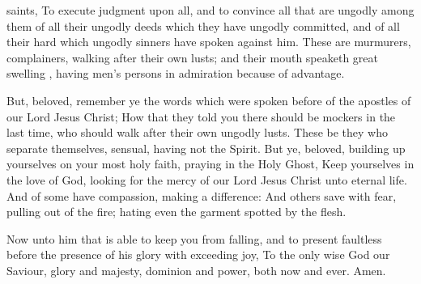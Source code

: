 {saints,
To
execute
judgment
upon
all,
and to
convince
all that are
ungodly among
them
of
all
their
ungodly
deeds
which they have ungodly
committed,
and
of
all their
hard
{}
which
ungodly
sinners have
spoken
against
him.
These
are
murmurers,
complainers,
walking
after their
own
lusts;
and
their
mouth
speaketh great
swelling
{},
having
men’s persons in
admiration because
of
advantage.
\par }{\PP {}But,
beloved,
remember
ye the
words which were spoken
before
of the
apostles
of
our
Lord
Jesus
Christ;
How
that they
told
you there should
be
mockers
in
the
last
time, who should
walk
after their
own
ungodly
lusts.
These
be they who
separate
themselves,
sensual,
having
not the
Spirit.
But
ye,
beloved, building
up
yourselves
on
your most
holy
faith,
praying
in
the
Holy
Ghost,
Keep
yourselves
in the
love of
God, looking
for the
mercy
of
our
Lord
Jesus
Christ
unto
eternal
life.
And of
some have
compassion, making a
difference:
And
others
save
with
fear,
pulling
{} out
of the
fire;
hating
even the
garment
spotted
by the
flesh.
\par }{\PP {}Now unto him that is
able to
keep
you from
falling,
and to
present
{}
faultless before the
presence
of
his
glory
with exceeding
joy,
To
the
only
wise
God
our
Saviour,
{}
glory
and
majesty,
dominion
and
power,
both
now
and
ever.
Amen.
\par }